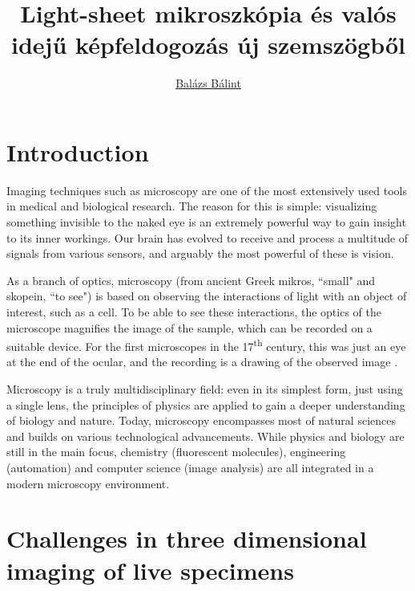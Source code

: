 \documentclass{booklet_style}
\author{\href{mailto:balint.balazs@embl.de}{Balázs Bálint}}
\title{Light-sheet mikroszkópia és valós idejű képfeldogozás új szemszögből}
\begin{document}
\graphicspath{{./figures/}}
\maketitle

\clearpage{\thispagestyle{empty}\cleardoublepage}


\setcounter{page}{1}
\section{Introduction}

Imaging techniques such as microscopy are one of the most extensively used tools in medical and biological research. The reason for this is simple: visualizing something invisible to the naked eye is an extremely powerful way to gain insight to its inner workings. Our brain has evolved to receive and process a multitude of signals from various sensors, and arguably the most powerful of these is vision.

As a branch of optics, microscopy (from ancient Greek mikros, ``small" and skopein, ``to see") is based on observing the interactions of light with an object of interest, such as a cell. To be able to see these interactions, the optics of the microscope magnifies the image of the sample, which can be recorded on a suitable device. For the first microscopes in the 17\textsuperscript{th} century, this was just an eye at the end of the ocular, and the recording is a drawing of the observed image \cite{hooke_micrographia:_1665}.

Microscopy is a truly multidisciplinary field: even in its simplest form, just using a single lens, the principles of physics are applied to gain a deeper understanding of biology and nature. Today, microscopy encompasses most of natural sciences and builds on various technological advancements. While physics and biology are still in the main focus, chemistry (fluorescent molecules), engineering (automation) and computer science (image analysis) are all integrated in a modern microscopy environment.


\section{Challenges in three dimensional imaging of live specimens}
\end{document}
